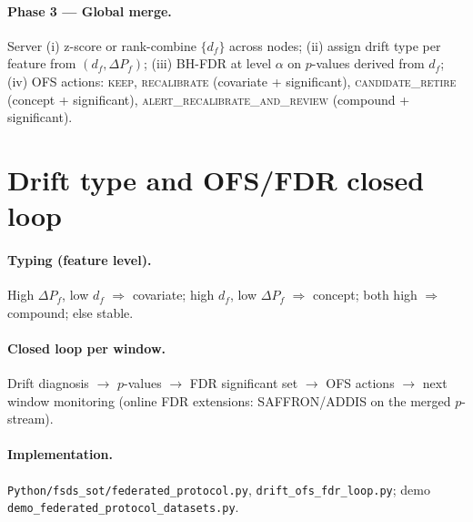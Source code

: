 \paragraph{Phase 3 --- Global merge.}
Server (i) z-score or rank-combine $\{d_f\}$ across nodes; (ii) assign drift type per feature from $(d_f,\Delta P_f)$;
(iii) BH-FDR at level $\alpha$ on $p$-values derived from $d_f$; (iv) OFS actions:
\textsc{keep}, \textsc{recalibrate} (covariate + significant),
\textsc{candidate\_retire} (concept + significant),
\textsc{alert\_recalibrate\_and\_review} (compound + significant).

\section{Drift type and OFS/FDR closed loop}

\paragraph{Typing (feature level).}
High $\Delta P_f$, low $d_f$ $\Rightarrow$ covariate; high $d_f$, low $\Delta P_f$ $\Rightarrow$ concept; both high $\Rightarrow$ compound; else stable.

\paragraph{Closed loop per window.}
Drift diagnosis $\rightarrow$ $p$-values $\rightarrow$ FDR significant set $\rightarrow$ OFS actions $\rightarrow$ next window monitoring (online FDR extensions: SAFFRON/ADDIS on the merged $p$-stream).

\paragraph{Implementation.}
\texttt{Python/fsds\_sot/federated\_protocol.py}, \texttt{drift\_ofs\_fdr\_loop.py}; demo \texttt{demo\_federated\_protocol\_datasets.py}.
